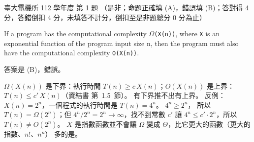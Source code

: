 \begin{pastexam}[label={px:ntu-112-ee-ds-01}]{臺大電機所 112 學年度 第 1 題}
（是非；命題正確填 (A)，錯誤填 (B)；答對得 4 分，答錯倒扣 4 分，未填答不計分，倒扣至是非題總分 0 分為止）

If a program has the computational complexity \texttt{$\Omega$(X(n))}, where \texttt{X} is an exponential function of the program input size n, then the program must also have the computational complexity \texttt{O(X(n))}.
\end{pastexam}

\begin{pastsoln}
答案是 (B)，錯誤。

$\Omega(X(n))$ 是下界：執行時間 $T(n) \ge c\,X(n)$；$O(X(n))$ 是上界：$T(n) \le c'\,X(n)$（資結書
第~1.5~節）。 有下界推不出有上界。 反例：$X(n) = 2^n$，一個程式的執行時間是 $T(n) = 4^n$。 $4^n \ge 2^n$，
所以 $T(n) = \Omega(2^n)$；但 $4^n / 2^n = 2^n \to \infty$，找不到常數 $c'$ 讓 $4^n \le c' \cdot 2^n$，所以
$T(n) \ne O(2^n)$。 $X$ 是指數函數並不會讓 $\Omega$ 變成 $\Theta$，比它更大的函數（更大的指數、$n!$、$n^n$）
多的是。
\end{pastsoln}

